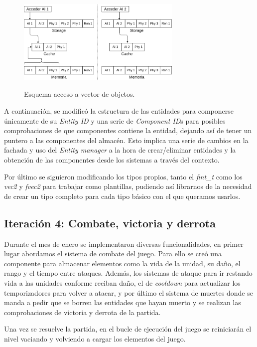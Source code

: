 \begin{figure}[hbt]
\centering
\includegraphics[width=0.7\textwidth]{imagenes/diario_desarrollo/memoria1.png}\\
\caption{Esquema acceso a vector de objetos.}
\label{fig:memoria_obj}
\end{figure}

A continuación, se modificó la estructura de las entidades para componerse únicamente de su
\textit{Entity ID} y una serie de \textit{Component ID}s para posibles comprobaciones de que
componentes contiene la entidad, dejando así de tener un puntero a las componentes del almacén.
Esto implica una serie de cambios en la fachada y uso del \textit{Entity manager} a la hora
de crear/eliminar entidades y la obtención de las componentes desde los sistemas a través del
contexto. 

Por último se siguieron modificando los tipos propios, tanto el \textit{fint\_t} como
los \textit{vec2} y \textit{fvec2} para trabajar como plantillas, pudiendo así librarnos de
la necesidad de crear un tipo completo para cada tipo básico con el que queramos usarlos.

\subsection*{Iteración 4: Combate, victoria y derrota}
Durante el mes de enero se implementaron diversas funcionalidades, en primer lugar abordamos
el sistema de combate del juego. Para ello se creó una componente para almacenar elementos como
la vida de la unidad, su daño, el rango y el tiempo entre ataques. Además, los sistemas de 
ataque para ir restando vida a las unidades conforme reciban daño, el de \textit{cooldown} para
actualizar los temporizadores para volver a atacar, y por último el sistema de muertes donde se
manda a pedir que se borren las entidades que hayan muerto y se realizan las comprobaciones 
de victoria y derrota de la partida.

Una vez se resuelve la partida, en el bucle de ejecución del juego se reiniciarán el nivel
vaciando y volviendo a cargar los elementos del juego.

